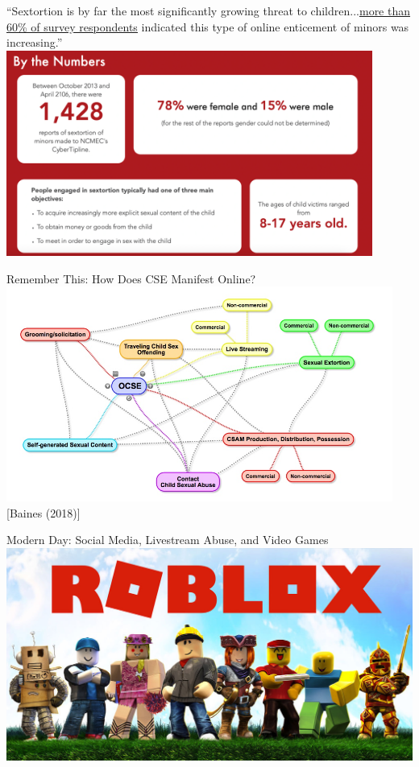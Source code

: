 \documentclass[nobackground,dvipsnames,table,aspectratio=169]{beamer}
\begin{document}
\begin{frame}{}
    \centering
    “Sextortion is by far the most significantly growing threat to children...\underline{\href{https://www.justice.gov/psc/file/842411/download}{more than 60\% of survey respondents}} indicated this type of online enticement of minors was increasing.”
    \includegraphics[width=0.9\textwidth]{sextortion-statistics}
\end{frame}

\begin{frame}{Remember This: How Does CSE Manifest Online?}
    \centering
    \includegraphics[width=0.95\textwidth]{ocse}
    [Baines (2018)]
\end{frame}

\begin{frame}{Modern Day: Social Media, Livestream Abuse, and Video Games}
    \includegraphics[width=\textwidth]{roblox}
\end{frame}
\end{document}

